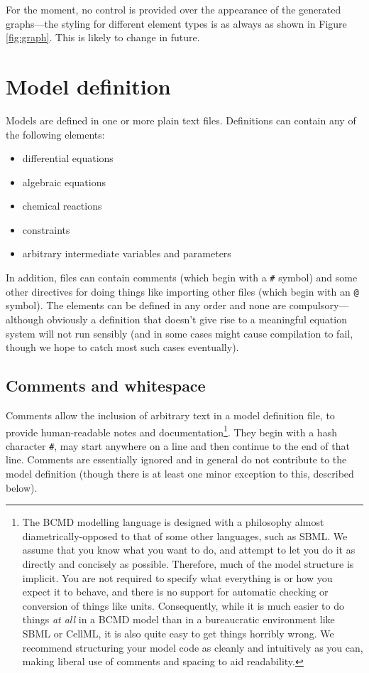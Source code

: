 \documentclass[a4paper,11pt]{article}
\begin{document}
For the moment, no control is provided over the appearance of the generated graphs---the styling for different element types is as always as shown in Figure \ref{fig:graph}. This is likely to change in future.

\section{Model definition}\label{models}

Models are defined in one or more plain text files. Definitions can contain any of the following elements:

\begin{itemize}
\item differential equations
\item algebraic equations
\item chemical reactions
\item constraints
\item arbitrary intermediate variables and parameters
\end{itemize}

In addition, files can contain comments (which begin with a \texttt{\#} symbol) and some other directives for doing things like importing other files (which begin with an \texttt{@} symbol). The elements can be defined in any order and none are compulsory---although obviously a definition that doesn't give rise to a meaningful equation system will not run sensibly (and in some cases might cause compilation to fail, though we hope to catch most such cases eventually).

\subsection{Comments and whitespace}
Comments allow the inclusion of arbitrary text in a model definition file, to provide human-readable notes and documentation\footnote{The BCMD modelling language is designed with a philosophy almost diametrically-opposed to that of some other languages, such as SBML. We assume that you know what you want to do, and attempt to let you do it as directly and concisely as possible. Therefore, much of the model structure is implicit. You are not required to specify what everything is or how you expect it to behave, and there is no support for automatic checking or conversion of things like units. Consequently, while it is much easier to do things \textit{at all} in a BCMD model than in a bureaucratic environment like SBML or CellML, it is also quite easy to get things horribly wrong. We recommend structuring your model code as cleanly and intuitively as you can, making liberal use of comments and spacing to aid readability.}. They begin with a hash character \texttt{\#}, may start anywhere on a line and then continue to the end of that line. Comments are essentially ignored and in general do not contribute to the model definition (though there is at least one minor exception to this, described below).
\end{document}
